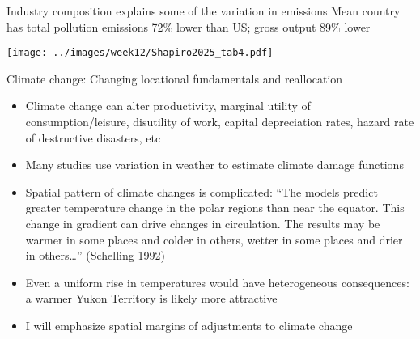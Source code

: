 \documentclass[11pt,notes=hide,aspectratio=169]{beamer}
\begin{document}
\begin{frame}{Industry composition explains some of the variation in emissions}
{\footnotesize Mean country has total pollution emissions 72\% lower than US; gross output 89\% lower}
\begin{center}
\texttt{[image: ../images/week12/Shapiro2025\_tab4.pdf]}
\end{center}
\end{frame}
\begin{frame}{Climate change: Changing locational fundamentals and reallocation}
\begin{itemize}
\item Climate change can alter productivity, marginal utility of consumption/leisure, disutility of work, capital depreciation rates, hazard rate of destructive disasters, etc
\item Many studies use variation in weather to estimate climate damage functions
\item Spatial pattern of climate changes is complicated: ``The models predict greater temperature change in the polar regions than near the equator. This change in gradient can drive changes in circulation. The results may be warmer in some places and colder in others, wetter in some places and drier in others\dots'' (\href{https://www.jstor.org/stable/2117599}{Schelling 1992})
\item Even a uniform rise in temperatures would have heterogeneous consequences:
a warmer Yukon Territory is likely more attractive
\item I will emphasize spatial margins of adjustments to climate change
\end{itemize}
\end{frame}
\end{document}
